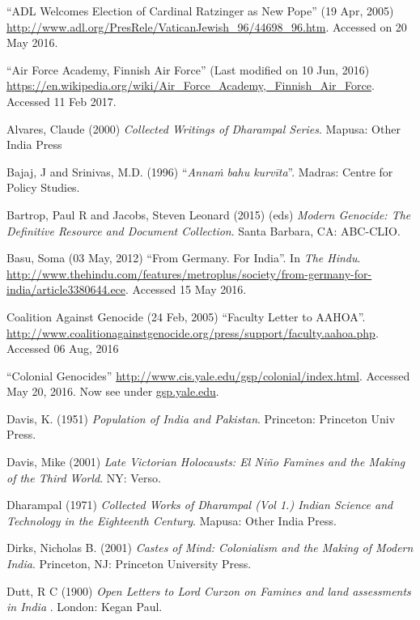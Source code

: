 \begin{thebibliography}{99}
\itemsep=2pt
“ADL Welcomes Election of Cardinal Ratzinger as New Pope” (19 Apr, 2005) \url{http://www.adl.org/PresRele/VaticanJewish_96/44698_96.htm}. Accessed on 20 May 2016. 

“Air Force Academy, Finnish Air Force” (Last modified on 10 Jun, 2016) \url{https://en.wikipedia.org/wiki/Air_Force_Academy,_Finnish_Air_Force}. Accessed 11 Feb 2017.

Alvares, Claude (2000) {\sl Collected Writings of Dharampal Series}. Mapusa: Other India Press

Bajaj, J and Srinivas, M.D. (1996) “{\sl Annaṁ bahu kurvīta}”. Madras: Centre for Policy Studies. 

Bartrop, Paul R and Jacobs, Steven Leonard (2015) (eds) {\sl Modern Genocide: The Definitive Resource and Document Collection}. Santa Barbara, CA: ABC-CLIO.

Basu, Soma (03 May, 2012) “From Germany. For India”. In {\sl The Hindu}. \url{http://www.thehindu.com/features/metroplus/society/from-germany-for-india/article3380644.ece}. Accessed 15 May 2016.

Coalition Against Genocide (24 Feb, 2005) “Faculty Letter to AAHOA”. 
\url{http://www.coalitionagainstgenocide.org/press/support/faculty.aahoa.php}. Accessed 06 Aug, 2016

“Colonial Genocides” \url{http://www.cis.yale.edu/gsp/colonial/index.html}. Accessed May 20, 2016. Now see under \url{gsp.yale.edu}.

Davis, K. (1951) {\sl Population of India and Pakistan}. Princeton: Princeton Univ Press.

Davis, Mike (2001) {\sl Late Victorian Holocausts: El Niño Famines and the Making of the Third World}. NY: Verso. 

Dharampal (1971) {\sl Collected Works of Dharampal (Vol 1.) Indian Science and Technology in the Eighteenth Century}. Mapusa: Other India Press.

Dirks, Nicholas B. (2001) {\sl Castes of Mind: Colonialism and the Making of Modern India}. Princeton, NJ: Princeton University Press.

Dutt, R C (1900) {\sl Open Letters to Lord Curzon on Famines and land assessments in India}	. London: Kegan Paul. 


\end{thebibliography}
